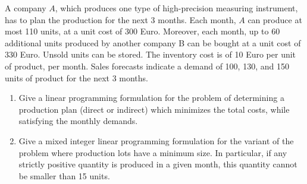 \documentclass[12pt, a4paper]{report}
\newtheorem[style=M,bodystyle=\normalfont]{theorem}{Theorem}
\newtheorem[style=M,bodystyle=\normalfont]{corollary}{Corollary}
\newtheorem[style=M,bodystyle=\normalfont]{lemma}{Lemma}
\newtheorem[style=M,bodystyle=\normalfont]{definition}{Definition}
\begin{document}
    \newpage 

    \begin{Exercise}[label=4]
        A company $A$, which produces one type of high-precision measuring instrument, has to plan the production for the next 3 months. Each month, $A$ can produce at most 110 units, 
        at a unit cost of 300 Euro. Moreover, each month, up to 60 additional units produced by another company B can be bought at a unit cost of 330 Euro. Unsold units can be 
        stored. The inventory cost is of 10 Euro per unit of product, per month. Sales forecasts indicate a demand of 100, 130, and 150 units of product for the next 3 months.
        \begin{enumerate}
            \item Give a linear programming formulation for the problem of determining a production plan (direct or indirect) which minimizes the total costs, while satisfying 
                the monthly demands.
            \item Give a mixed integer linear programming formulation for the variant of the problem where production lots have a minimum size. In particular, if any strictly 
                positive quantity is produced in a given month, this quantity cannot be smaller than 15 units. 
        \end{enumerate}
    \end{Exercise}
\end{document}
